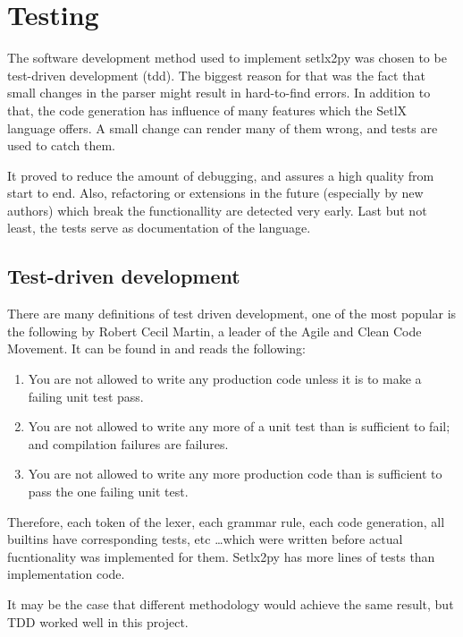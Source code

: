 \section{Testing}

The software development method used to implement setlx2py was chosen to be test-driven development (\gls{tdd}). The biggest reason for that was the fact that small changes in the parser might result in hard-to-find errors. In addition to that, the code generation has influence of many features which the SetlX language offers. A small change can render many of them wrong, and tests are used to catch them.

It proved to reduce the amount of debugging, and assures a high quality from start to end. Also, refactoring or extensions in the future (especially by new authors) which break the functionallity are detected very early. Last but not least, the tests serve as documentation of the language.

\subsection{Test-driven development}

There are many definitions of test driven development, one of the most popular is the following by Robert Cecil Martin, a leader of the Agile and Clean Code Movement. It can be found in \cite{tdd} and reads the following:

\begin{enumerate}
\item You are not allowed to write any production code unless it is to make a failing unit test pass.
\item You are not allowed to write any more of a unit test than is sufficient to fail; and compilation failures are failures.
\item You are not allowed to write any more production code than is sufficient to pass the one failing unit test.
\end{enumerate}

Therefore, each token of the lexer, each grammar rule, each code generation, all builtins have corresponding tests, etc \ldots which were written before actual fucntionality was implemented for them. Setlx2py has more lines of tests than implementation code.

It may be the case that different methodology would achieve the same result, but TDD worked well in this project.

\clearpage
